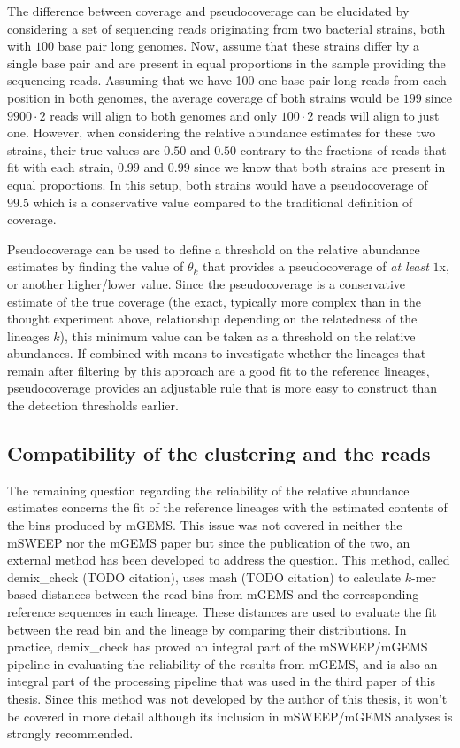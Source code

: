 \documentclass[officiallayout]{tktla}
\begin{document}
The difference between coverage and pseudocoverage can be elucidated
by considering a set of sequencing reads originating from two
bacterial strains, both with $100$ base pair long genomes. Now, assume
that these strains differ by a single base pair and are present in
equal proportions in the sample providing the sequencing
reads. Assuming that we have 100 one base pair long reads from each
position in both genomes, the average coverage of both strains would
be $199$ since $9900\cdot2$ reads will align to both genomes and only
$100\cdot2$ reads will align to just one. However, when considering
the relative abundance estimates for these two strains, their true
values are $0.50$ and $0.50$ \textemdash{ } contrary to the fractions
of reads that fit with each strain, $0.99$ and $0.99$ \textemdash{ }
since we know that both strains are present in equal proportions. In
this setup, both strains would have a pseudocoverage of $99.5$ which
is a conservative value compared to the traditional definition of
coverage.

Pseudocoverage can be used to define a threshold on the relative
abundance estimates by finding the value of $\theta_{k}$ that provides
a pseudocoverage of \textit{at least} $1$x, or another higher/lower
value. Since the pseudocoverage is a conservative estimate of the true
coverage (the exact, typically more complex than in the thought
experiment above, relationship depending on the relatedness of the
lineages $k$), this minimum value can be taken as a threshold on the
relative abundances. If combined with means to investigate whether the
lineages that remain after filtering by this approach are a good fit
to the reference lineages, pseudocoverage provides an adjustable rule
that is more easy to construct than the detection thresholds earlier.

\subsection{Compatibility of the clustering and the reads}

The remaining question regarding the reliability of the relative
abundance estimates concerns the fit of the reference lineages with
the estimated contents of the bins produced by mGEMS. This issue was
not covered in neither the mSWEEP nor the mGEMS paper but since the
publication of the two, an external method has been developed to
address the question. This method, called demix\_check (TODO
citation), uses mash (TODO citation) to calculate $k$-mer based
distances between the read bins from mGEMS and the corresponding
reference sequences in each lineage. These distances are used to
evaluate the fit between the read bin and the lineage by comparing
their distributions. In practice, demix\_check has proved an integral
part of the mSWEEP/mGEMS pipeline in evaluating the reliability of the
results from mGEMS, and is also an integral part of the processing
pipeline that was used in the third paper of this thesis. Since this
method was not developed by the author of this thesis, it won't be
covered in more detail although its inclusion in mSWEEP/mGEMS analyses
is strongly recommended.
\end{document}
